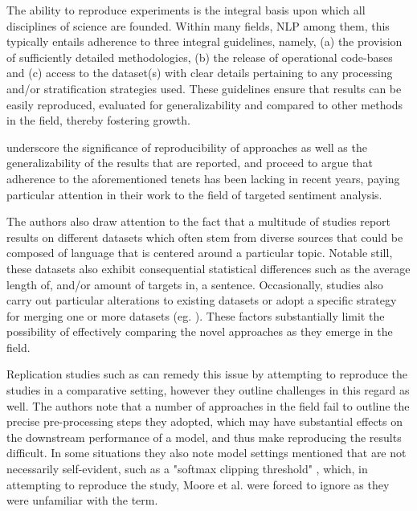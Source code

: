 \documentclass[../../fyp.tex]{subfiles}
\begin{document}
The ability to reproduce experiments is the integral basis upon which all disciplines of science are founded. Within many fields, NLP among them, this typically entails adherence to three integral guidelines, namely, (a) the provision of sufficiently detailed methodologies, (b) the release of operational code-bases and (c) access to the dataset(s) with clear details pertaining to any processing and/or stratification strategies used. These guidelines ensure that results can be easily reproduced, evaluated for generalizability and compared to other methods in the field, thereby fostering growth.

\citet{moore2018} underscore the significance of reproducibility of approaches as well as the generalizability of the results that are reported, and proceed to argue that adherence to the aforementioned tenets has been lacking in recent years, paying particular attention in their work to the field of targeted sentiment analysis.

The authors also draw attention to the fact that a multitude of studies report results on different datasets which often stem from diverse sources that could be composed of language that is centered around a particular topic. Notable still, these datasets also exhibit consequential statistical differences such as the average length of, and/or amount of targets in, a sentence. Occasionally, studies also carry out particular alterations to existing datasets or adopt a specific strategy for merging one or more datasets (eg. \cite{xue2018}). These factors substantially limit the possibility of effectively comparing the novel approaches as they emerge in the field.

Replication studies such as \cite{moore2018} can remedy this issue by attempting to reproduce the studies in a comparative setting, however they outline challenges in this regard as well. The authors note that a number of approaches in the field fail to outline the precise pre-processing steps they adopted, which may have substantial effects on the downstream performance of a model, and thus make reproducing the results difficult. In some situations they also note model settings mentioned that are not necessarily self-evident, such as a "softmax clipping threshold" \cite{tang2016b}, which, in attempting to reproduce the study, Moore et al. \cite{moore2018} were forced to ignore as they were unfamiliar with the term.
\end{document}
